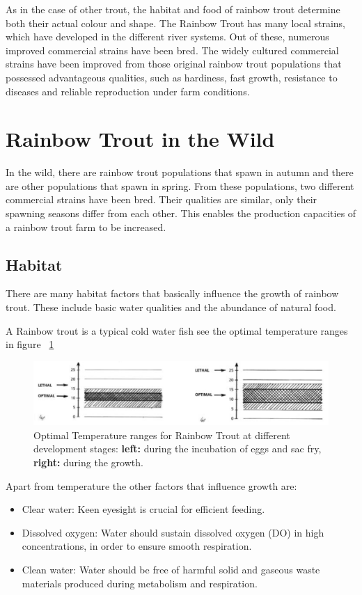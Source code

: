 As in the case of other trout, the habitat and food of rainbow trout determine both their actual colour and shape.
The Rainbow Trout has many local strains, which have developed in the different river systems. Out of these, numerous improved commercial strains have been bred. The widely cultured commercial strains have been improved from those original rainbow trout populations that possessed advantageous qualities, such as hardiness, fast growth, resistance to diseases and reliable reproduction under farm conditions.


\section{Rainbow Trout in the Wild}

In the wild, there are rainbow trout populations that spawn in autumn and there are other populations that spawn in spring. From these populations, two different commercial strains have been bred. Their qualities are similar, only their spawning seasons differ from each other. This enables the production capacities of a rainbow trout farm to be increased.

\subsection{Habitat}
There are many habitat factors that basically influence the growth of rainbow trout. These include basic water qualities and the abundance of natural food.

A Rainbow trout is a typical cold water fish see the optimal temperature ranges in figure  ~\ref{fig:TempRanges}

\begin{figure}[H]
  \centering
   \includegraphics[scale = 0.7]{images/TempRanges.png}
  \caption{Optimal Temperature ranges for Rainbow Trout at different development stages: {\bf left:} during the incubation of eggs and sac fry, {\bf right:} during the growth. }
   \label{fig:TempRanges}
\end{figure}

Apart from temperature the other factors that influence growth are:

\begin{itemize}
\item[]Clear water: Keen eyesight is crucial for efficient feeding.
\item[]Dissolved oxygen: Water should sustain dissolved oxygen (DO) in high concentrations, in order to ensure smooth respiration. 
\item[]Clean water: Water should be free of harmful solid and gaseous waste materials produced during metabolism and respiration.
\end{itemize}



